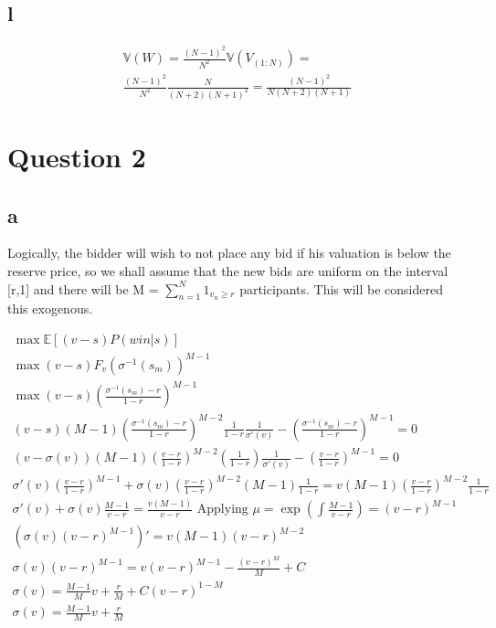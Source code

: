 \documentclass[10pt]{paper}
\begin{document}
\subsection*{l}

\begin{align*}
  \mathbb{V}(W) = \frac{(N-1)^2}{N^2} \mathbb{V}(V_{(1:N)}) = \\
  \frac{(N-1)^2}{N^2} \frac{N}{(N+2)(N+1)^2} = \frac{(N-1)^2}{N(N+2)(N+1)}
\end{align*}


\section*{Question 2}

\subsection*{a}


Logically, the bidder will wish to not place any bid if his valuation is below
the reserve price, so we shall assume that the new bids are uniform on the interval
[r,1] and there will be M = $\sum_{n=1}^N 1_{v_n \geq r}$ participants. This  will be
considered this exogenous.

\begin{align*}
  \max \mathbb{E}[ (v-s)P( win | s ) ] \\
  \max (v-s)F_v(\sigma^{-1}(s_m))^{M-1}\\
  \max (v-s) (\frac{\sigma^{-1}(s_m) -r }{1-r})^{M-1}\\
  (v-s)(M-1)(\frac{\sigma^{-1}(s_m) - r}{1-r})^{M-2} \frac{1}{1-r} \frac{1}{\sigma'(v)} - (\frac{\sigma^{-1}(s_m) -r}{1-r})^{M-1} = 0\\
  (v-\sigma(v))(M-1)(\frac{v - r}{1-r})^{M-2} (\frac{1}{1-r}) \frac{1}{\sigma'(v)} - (\frac{v -r}{1-r})^{M-1} = 0\\
  \sigma'(v) (\frac{v-r}{1-r})^{M-1} + \sigma(v) (\frac{v-r}{1-r})^{M-2} (M-1) \frac{1}{1-r} = v(M-1)(\frac{v-r}{1-r})^{M-2} \frac{1}{1-r}\\
  \sigma'(v) + \sigma(v) \frac{M-1}{v-r} = \frac{v(M-1)}{v-r} \text{ Applying } \mu = \exp( \int \frac{M-1}{v-r}) = (v-r)^{M-1}\\
  (\sigma(v)(v-r)^{M-1})' = v(M-1)(v-r)^{M-2}\\
  \sigma(v)(v-r)^{M-1} = v(v-r)^{M-1} - \frac{(v-r)^M}{M} + C\\
  \sigma(v) = \frac{M-1}{M}v + \frac{r}{M} + C(v-r)^{1-M}\\
  \sigma(v) = \frac{M-1}{M}v + \frac{r}{M}\\
\end{align*}
\end{document}

